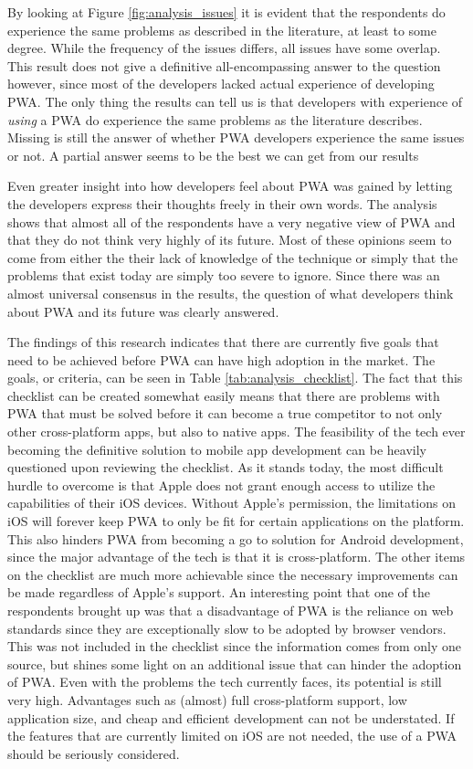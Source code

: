 \documentclass[a4paper,12pt]{article}
\begin{document}
By looking at Figure \ref{fig:analysis_issues} it is evident that the respondents do experience the same problems as described in the literature, at least to some degree. While the frequency of the issues differs, all issues have some overlap. This result does not give a definitive all-encompassing answer to the question however, since most of the developers lacked actual experience of developing PWA. The only thing the results can tell us is that developers with experience of \textit{using} a PWA do experience the same problems as the literature describes. Missing is still the answer of whether PWA developers experience the same issues or not. A partial answer seems to be the best we can get from our results

Even greater insight into how developers feel about PWA was gained by letting the developers express their thoughts freely in their own words. The analysis shows that almost all of the respondents have a very negative view of PWA and that they do not think very highly of its future. Most of these opinions seem to come from either the their lack of knowledge of the technique or simply that the problems that exist today are simply too severe to ignore. Since there was an almost universal consensus in the results, the question of what developers think about PWA and its future was clearly answered.

The findings of this research indicates that there are currently five goals that need to be achieved before PWA can have high adoption in the market. The goals, or criteria, can be seen in Table \ref{tab:analysis_checklist}. The fact that this checklist can be created somewhat easily means that there are problems with PWA that must be solved before it can become a true competitor to not only other cross-platform apps, but also to native apps. The feasibility of the tech ever becoming the definitive solution to mobile app development can be heavily questioned upon reviewing the checklist. As it stands today, the most difficult hurdle to overcome is that Apple does not grant enough access to utilize the capabilities of their iOS devices. Without Apple's permission, the limitations on iOS will forever keep PWA to only be fit for certain applications on the platform. This also hinders PWA from becoming a go to solution for Android development, since the major advantage of the tech is that it is cross-platform. The other items on the checklist are much more achievable since the necessary improvements can be made regardless of Apple's support. An interesting point that one of the respondents brought up was that a disadvantage of PWA is the reliance on web standards since they are exceptionally slow to be adopted by browser vendors. This was not included in the checklist since the information comes from only one source, but shines some light on an additional issue that can hinder the adoption of PWA. Even with the problems the tech currently faces, its potential is still very high. Advantages such as (almost) full cross-platform support, low application size, and cheap and efficient development can not be understated. If the features that are currently limited on iOS are not needed, the use of a PWA should be seriously considered.
\end{document}
